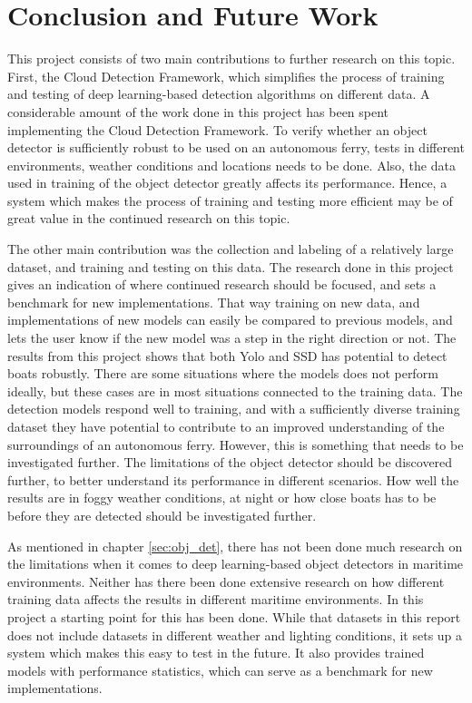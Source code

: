 \chapter{Conclusion and Future Work}

This project consists of two main contributions to further research on this topic. First, the Cloud Detection Framework, which simplifies the process of training and testing of deep learning-based detection algorithms on different data. A considerable amount of the work done in this project has been spent implementing the Cloud Detection Framework. To verify whether an object detector is sufficiently robust to be used on an autonomous ferry, tests in different environments, weather conditions and locations needs to be done. Also, the data used in training of the object detector greatly affects its performance. Hence, a system which makes the process of training and testing more efficient may be of great value in the continued research on this topic.

\vspace{1mm}
\noindent
The other main contribution was the collection and labeling of a relatively large dataset, and training and testing on this data. The research done in this project gives an indication of where continued research should be focused, and sets a benchmark for new implementations. That way training on new data, and implementations of new models can easily be compared to previous models, and lets the user know if the new model was a step in the right direction or not. The results from this project shows that both Yolo and SSD has potential to detect boats robustly. There are some situations where the models does not perform ideally, but these cases are in most situations connected to the training data. The detection models respond well to training, and with a sufficiently diverse training dataset they have potential to contribute to an improved understanding of the surroundings of an autonomous ferry. However, this is something that needs to be investigated further. The limitations of the object detector should be discovered further, to better understand its performance in different scenarios. How well the results are in foggy weather conditions, at night or how close boats has to be before they are detected should be investigated further. 

\vspace{1mm}
\noindent
As mentioned in chapter \ref{sec:obj_det}, there has not been done much research on the limitations when it comes to deep learning-based object detectors in maritime environments. Neither has there been done extensive research on how different training data affects the results in different maritime environments. In this project a starting point for this has been done. While that datasets in this report does not include datasets in different weather and lighting conditions, it sets up a system which makes this easy to test in the future. It also provides trained models with performance statistics, which can serve as a benchmark for new implementations.

